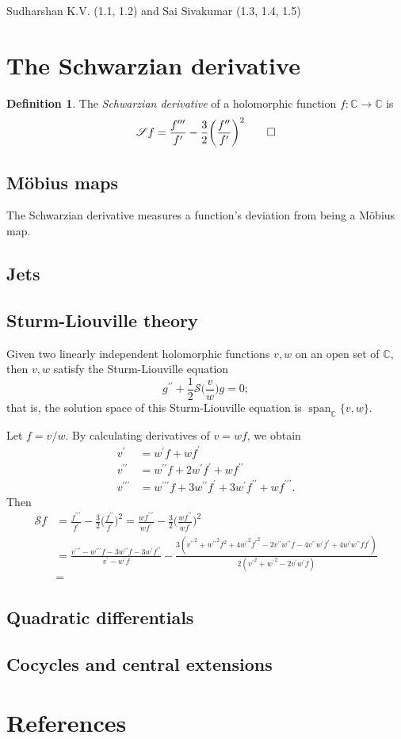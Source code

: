 \documentclass[11pt,leqno]{article}
\theoremstyle{plain}
\theoremstyle{definition}
\newtheorem{definition/}[lem]{Definition}
\newenvironment{definition}
  {\renewcommand{\qedsymbol}{\textdagger}%
   \pushQED{\qed}\begin{definition/}}
  {\popQED\end{definition/}}
\numberwithin{equation}{section}
\numberwithin{lem}{section}
\DeclareMathOperator{\Span}{span}
\begin{document}
Sudharshan K.V. (1.1, 1.2) and Sai Sivakumar (1.3, 1.4, 1.5)

\section{The Schwarzian derivative}
\begin{definition}
    The \textit{Schwarzian derivative} of a holomorphic function $f\colon \mathbb C\to \mathbb C$ is
    \[\mathscr Sf = \frac{f^{\prime\prime\prime}}{f^\prime}-\frac{3}{2}\biggl(\frac{f^{\prime\prime}}{f^\prime}\biggr)^2\qedhere\]
\end{definition}
\subsection{M\"obius maps}
The Schwarzian derivative measures a function's deviation from being a M\"obius map.
\subsection{Jets}
\subsection{Sturm-Liouville theory}
Given two linearly independent holomorphic functions $v,w$ on an open set of $\mathbb C$, then $v,w$ satisfy the Sturm-Liouville equation
\[g^{\prime\prime} + \frac{1}{2}\mathscr S\biggl(\frac{v}{w}\biggr)g = 0;\]
that is, the solution space of this Sturm-Liouville equation is $\Span_{\mathbb C}\{v,w\}$.

Let $f = v/w$. By calculating derivatives of $v = wf$, we obtain 
\begin{align*}
    v^\prime &= w^\prime f + wf^\prime\\
    v^{\prime\prime} &= w^{\prime\prime}f + 2w^\prime f^\prime + wf^{\prime\prime}\\
    v^{\prime\prime\prime} &= w^{\prime\prime\prime}f + 3w^{\prime\prime}f^\prime + 3w^\prime f^{\prime\prime} + wf^{\prime\prime\prime}.
\end{align*}
Then 
\begin{align*}
    \mathscr Sf &= \frac{f^{\prime\prime\prime}}{f^\prime}-\frac{3}{2}\biggl(\frac{f^{\prime\prime}}{f^\prime}\biggr)^2 = \frac{wf^{\prime\prime\prime}}{wf^\prime}-\frac{3}{2}\biggl(\frac{wf^{\prime\prime}}{wf^\prime}\biggr)^2\\
    &= \frac{v^{\prime\prime\prime}-w^{\prime\prime\prime}f-3w^{\prime\prime}f-3w^\prime f^{\prime\prime}}{v^\prime-w^\prime f} - \frac{3({v^{\prime\prime}}^2 + {w^{\prime\prime}}^2f^2 + 4{w^{\prime}}^2{f^{\prime}}^2 -2v^{\prime\prime}w^{\prime\prime}f -4v^{\prime\prime}w^\prime f^\prime +4w^\prime w^{\prime\prime}ff^\prime)}{2({v^\prime}^2 + {w^\prime}^2 - 2v^\prime w^\prime f)}\\
    &= 
\end{align*}
\subsection{Quadratic differentials}
\subsection{Cocycles and central extensions}

\newpage\section*{References}
\end{document}
